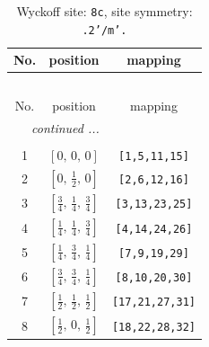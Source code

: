 \documentclass[fleqn,8pt]{jsarticle}
\begin{document}
\renewcommand{\arraystretch}{1.2}
\begin{longtable}{ccc}
\caption{Wyckoff site: {\tt 8c}, site symmetry: {\tt .2'/m'.}}
 \\
 \hline \hline
No. & position & mapping \\ \hline \endfirsthead

\multicolumn{2}{l}{\tablename\ \thetable{}} \\
 \hline \hline
No. & position & mapping \\ \hline \endhead

 \hline \hline
\multicolumn{2}{r}{\footnotesize\it continued ...} \\ \endfoot

 \hline \hline
\multicolumn{2}{r}{} \\ \endlastfoot

1 & $\left[ 0,\, 0,\, 0 \right]$ & {\tt [1,5,11,15]} \\ \hline
2 & $\left[ 0,\, \frac{1}{2},\, 0 \right]$ & {\tt [2,6,12,16]} \\ \hline
3 & $\left[ \frac{3}{4},\, \frac{1}{4},\, \frac{3}{4} \right]$ & {\tt [3,13,23,25]} \\ \hline
4 & $\left[ \frac{1}{4},\, \frac{1}{4},\, \frac{3}{4} \right]$ & {\tt [4,14,24,26]} \\ \hline
5 & $\left[ \frac{1}{4},\, \frac{3}{4},\, \frac{1}{4} \right]$ & {\tt [7,9,19,29]} \\ \hline
6 & $\left[ \frac{3}{4},\, \frac{3}{4},\, \frac{1}{4} \right]$ & {\tt [8,10,20,30]} \\ \hline
7 & $\left[ \frac{1}{2},\, \frac{1}{2},\, \frac{1}{2} \right]$ & {\tt [17,21,27,31]} \\ \hline
8 & $\left[ \frac{1}{2},\, 0,\, \frac{1}{2} \right]$ & {\tt [18,22,28,32]} \\
\end{longtable}
\renewcommand{\arraystretch}{1.2}
\end{document}
